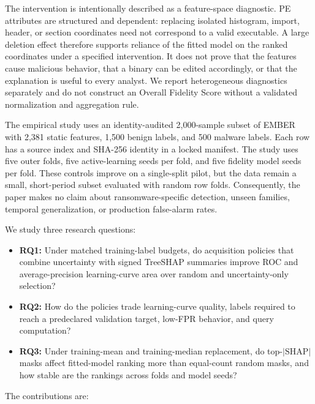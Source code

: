 The intervention is intentionally described as a feature-space diagnostic. PE
attributes are structured and dependent: replacing isolated histogram, import,
header, or section coordinates need not correspond to a valid executable. A
large deletion effect therefore supports reliance of the fitted model on the
ranked coordinates under a specified intervention. It does not prove that the
features cause malicious behavior, that a binary can be edited accordingly, or
that the explanation is useful to every analyst. We report heterogeneous
diagnostics separately and do not construct an Overall Fidelity Score without a
validated normalization and aggregation rule.

The empirical study uses an identity-audited 2,000-sample subset of EMBER with
2,381 static features, 1,500 benign labels, and 500 malware labels. Each row has
a source index and SHA-256 identity in a locked manifest. The study uses five
outer folds, five active-learning seeds per fold, and five fidelity model seeds
per fold. These controls improve on a single-split pilot, but the data remain a
small, short-period subset evaluated with random row folds. Consequently, the
paper makes no claim about ransomware-specific detection, unseen families,
temporal generalization, or production false-alarm rates.

We study three research questions:

\begin{itemize}
    \item \textbf{RQ1:} Under matched training-label budgets, do acquisition
    policies that combine uncertainty with signed TreeSHAP summaries improve ROC
    and average-precision learning-curve area over random and uncertainty-only
    selection?
    \item \textbf{RQ2:} How do the policies trade learning-curve quality, labels
    required to reach a predeclared validation target, low-FPR behavior, and
    query computation?
    \item \textbf{RQ3:} Under training-mean and training-median replacement, do
    top-$|\mathrm{SHAP}|$ masks affect fitted-model ranking more than equal-count
    random masks, and how stable are the rankings across folds and model seeds?
\end{itemize}

The contributions are:

